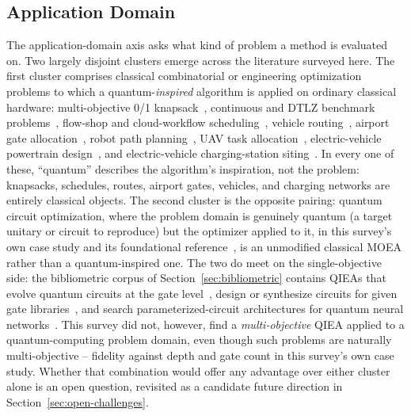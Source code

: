 \subsection{Application Domain}
\label{sec:taxonomy:application}

The application-domain axis asks what kind of problem a method is
evaluated on. Two largely disjoint clusters emerge across the literature
surveyed here. The first cluster comprises classical combinatorial or
engineering optimization problems to which a quantum-\emph{inspired}
algorithm is applied on ordinary classical hardware: multi-objective 0/1
knapsack~\citep{kim2006qmea,lu2013apmqea}, continuous and DTLZ benchmark
problems~\citep{olvera2023continuous,kim2011mqeaps}, flow-shop and
cloud-workflow scheduling~\citep{li2007hqga,hussain2022moqiga}, vehicle
routing~\citep{zhang2012moqeavrp}, airport gate
allocation~\citep{deng2020gate,deng2024moqead}, robot path
planning~\citep{kim2011mqeaps}, UAV task
allocation~\citep{mousavi2019uav}, electric-vehicle powertrain
design~\citep{wang2014powertrain}, and electric-vehicle
charging-station siting~\citep{kumar2026eahqnsga2}. In every one
of these, ``quantum'' describes the algorithm's inspiration, not the
problem: knapsacks, schedules, routes, airport gates, vehicles, and
charging networks are entirely classical objects. The second cluster is the
opposite pairing: quantum circuit optimization, where the problem
domain is genuinely quantum (a target unitary or circuit to reproduce)
but the optimizer applied to it, in this survey's own case study and its
foundational reference~\citep{ghlib2026scalable}, is an unmodified
classical MOEA rather than a quantum-inspired one. The two do meet on
the single-objective side: the bibliometric corpus of
Section~\ref{sec:bibliometric} contains QIEAs that evolve quantum
circuits at the gate level~\citep{ding2008qcircuits}, design or
synthesize circuits for given gate
libraries~\citep{krylov2019qeqea,chou2022qcsynthesis}, and search
parameterized-circuit architectures for quantum neural
networks~\citep{li2025aqeaqas}. This survey did not, however, find a
\emph{multi-objective} QIEA applied to a quantum-computing problem
domain, even though such problems are naturally multi-objective --
fidelity against depth and gate count in this survey's own case study.
Whether that combination would offer any advantage over either cluster
alone is an open question, revisited as a candidate future direction
in Section~\ref{sec:open-challenges}.
